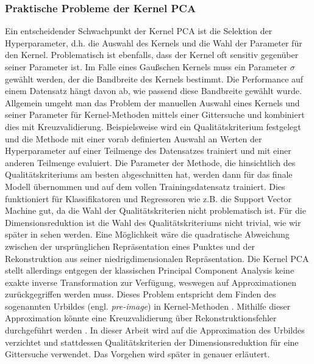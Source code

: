 \subsubsection{Praktische Probleme der Kernel PCA}
\label{ch:MethodenDerDimRed:statistisch:kPCA:AuswahlKF}

Ein entscheidender Schwachpunkt der Kernel PCA ist die Selektion der Hyperparameter, d.h. die
Auswahl des Kernels und die Wahl der Parameter für den Kernel. Problematisch ist ebenfalls, dass
der Kernel oft sensitiv gegenüber seiner Parameter ist. Im Falle eines Gaußschen Kernels muss ein
Parameter $\sigma$ gewählt werden, der die Bandbreite des Kernels bestimmt. Die Performance auf
einem Datensatz hängt davon ab, wie passend diese Bandbreite gewählt wurde. Allgemein umgeht man
das Problem der manuellen Auswahl eines Kernels und seiner Parameter für Kernel-Methoden mittels
einer Gittersuche und kombiniert dies mit Kreuzvalidierung. Beispielsweise wird ein
Qualitätskriterium festgelegt und die Methode mit einer vorab definierten Auswahl an Werten der
Hyperparameter auf einer Teilmenge des Datensatzes trainiert und mit einer anderen Teilmenge
evaluiert. Die Parameter der Methode, die hinsichtlich des Qualitätskriteriums am besten
abgeschnitten hat, werden dann für das finale Modell übernommen und auf dem vollen
Trainingsdatensatz trainiert. Dies funktioniert für Klassifikatoren und Regressoren wie z.B. die
Support Vector Machine gut, da die Wahl der Qualitätskriterien nicht problematisch ist. Für die
Dimensionsreduktion ist die Wahl des Qualitätskriteriums nicht trivial, wie wir später in
 sehen werden. Eine Möglichkeit
wäre die quadratische Abweichung zwischen der ursprünglichen Repräsentation eines Punktes und der
Rekonstruktion aus seiner niedrigdimensionalen Repräsentation. Die Kernel PCA stellt allerdings
entgegen der klassischen Principal Component Analysis keine exakte inverse Transformation zur
Verfügung, weswegen auf Approximationen zurückgegriffen werden muss. Dieses Problem entspricht dem
Finden des sogenannten Urbildes (engl. \textit{pre-image}) in Kernel-Methoden \parencite{Kwok.2004}. Mithilfe dieser Approximation könnte eine Kreuzvalidierung über
Rekonstruktionsfehler durchgeführt werden \parencite[siehe z.B.][]{Alam.2014}. In dieser Arbeit wird auf die Approximation des Urbildes
verzichtet und stattdessen Qualitätskriterien der Dimensionsreduktion für eine Gittersuche
verwendet. Das Vorgehen wird später in 
genauer erläutert.

